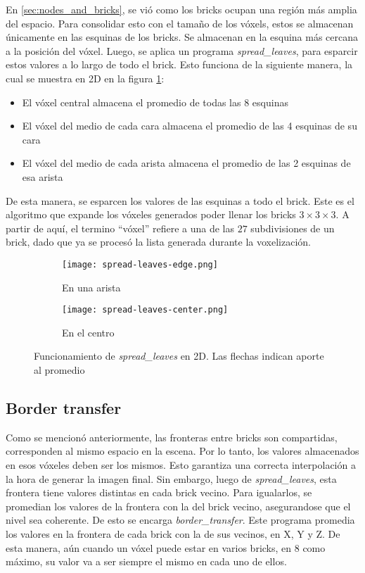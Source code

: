 En \ref{sec:nodes_and_bricks}, se vió como los bricks ocupan una región más amplia del espacio.
Para consolidar esto con el tamaño de los vóxels, estos se almacenan únicamente en las esquinas de los bricks.
Se almacenan en la esquina más cercana a la posición del vóxel.
Luego, se aplica un programa \textit{spread\_leaves}, para esparcir estos valores a lo largo de todo el brick.
Esto funciona de la siguiente manera, la cual se muestra en 2D en la figura \ref{fig:spread-leaves}:
\begin{itemize}
    \item El vóxel central almacena el promedio de todas las 8 esquinas
    \item El vóxel del medio de cada cara almacena el promedio de las 4 esquinas de su cara
    \item El vóxel del medio de cada arista almacena el promedio de las 2 esquinas de esa arista
\end{itemize}
De esta manera, se esparcen los valores de las esquinas a todo el brick.
Este es el algoritmo que expande los vóxeles generados poder llenar los bricks $3\times3\times3$.
A partir de aquí, el termino ``vóxel'' refiere a una de las $27$ subdivisiones de un brick, dado que ya se procesó la lista generada durante la voxelización.

\begin{figure}
    \begin{subfigure}{.5\textwidth}
        \centering
        \texttt{[image: spread-leaves-edge.png]}
        \caption{En una arista}
    \end{subfigure}
    \begin{subfigure}{.5\textwidth}
        \centering
        \texttt{[image: spread-leaves-center.png]}
        \caption{En el centro}
    \end{subfigure}
    \caption{Funcionamiento de \textit{spread\_leaves} en 2D. Las flechas indican aporte al promedio}
    \label{fig:spread-leaves}
\end{figure}

\subsection{Border transfer}\label{sec:border_transfer}

Como se mencionó anteriormente, las fronteras entre bricks son compartidas, corresponden al mismo espacio en la escena.
Por lo tanto, los valores almacenados en esos vóxeles deben ser los mismos.
Esto garantiza una correcta interpolación a la hora de generar la imagen final.
Sin embargo, luego de \textit{spread\_leaves}, esta frontera tiene valores distintas en cada brick vecino.
Para igualarlos, se promedian los valores de la frontera con la del brick vecino, asegurandose que el nivel sea coherente.
De esto se encarga \textit{border\_transfer}.
Este programa promedia los valores en la frontera de cada brick con la de sus vecinos, en X, Y y Z.
De esta manera, aún cuando un vóxel puede estar en varios bricks, en $8$ como máximo, su valor va a ser siempre el mismo en cada uno de ellos.

